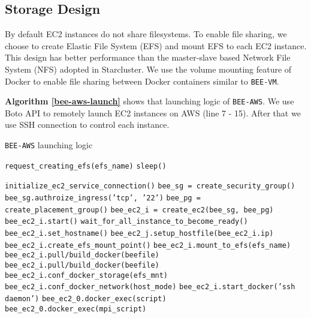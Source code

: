 \subsection{Storage Design}
By default EC2 instances do not share filesystems. To enable file sharing, we choose to create Elastic File System (EFS) and mount EFS to each EC2 instance. This design has better performance than the master-slave based Network File System (NFS) adopted in Starcluster. We use the volume mounting feature of Docker to enable file sharing between Docker containers similar to \texttt{BEE-VM}.

\textbf{Algorithm \ref{bee-aws-launch}} shows that launching logic of \texttt{BEE-AWS}. We use Boto API to remotely launch EC2 instances on AWS (line 7 - 15). After that we use SSH connection to control each instance. 

\begin{algorithm}
\caption{\texttt{BEE-AWS} launching logic}
\label{bee-aws-launch}
\begin{algorithmic}[1]
\STATE \texttt{request\_creating\_efs(efs\_name)}
\STATE \texttt{sleep()}
\ENDWHILE
\ENDIF

\STATE \texttt{initialize\_ec2\_service\_connection()}
\STATE \texttt{bee\_sg = create\_security\_group()}
\STATE \texttt{bee\_sg.authroize\_ingress('tcp', '22')}
\STATE \texttt{bee\_pg = create\_placement\_group()}
\STATE \texttt{bee\_ec2\_i = create\_ec2(bee\_sg, bee\_pg)}
\STATE \texttt{bee\_ec2\_i.start()}
\ENDFOR
\STATE \texttt{wait\_for\_all\_instance\_to\_become\_ready()}
\STATE \texttt{bee\_ec2\_i.set\_hostname()}
\STATE \texttt{bee\_ec2\_j.setup\_hostfile(bee\_ec2\_i.ip)}
\ENDFOR
\ENDFOR
{}
\STATE \texttt{bee\_ec2\_i.create\_efs\_mount\_point()}
\STATE \texttt{bee\_ec2\_i.mount\_to\_efs(efs\_name)}
\STATE \texttt{bee\_ec2\_i.pull/build\_docker(beefile)}
\ENDFOR
{}
\STATE \texttt{bee\_ec2\_i.pull/build\_docker(beefile)}
\STATE \texttt{bee\_ec2\_i.conf\_docker\_storage(efs\_mnt)}
\STATE \texttt{bee\_ec2\_i.conf\_docker\_network(host\_mode)}
\STATE \texttt{bee\_ec2\_i.start\_docker('ssh daemon')}
\ENDFOR
{}
\STATE \texttt{bee\_ec2\_0.docker\_exec(script)}
\ENDFOR
{}
\STATE \texttt{bee\_ec2\_0.docker\_exec(mpi\_script)}
\ENDFOR
\end{algorithmic}
\end{algorithm}


